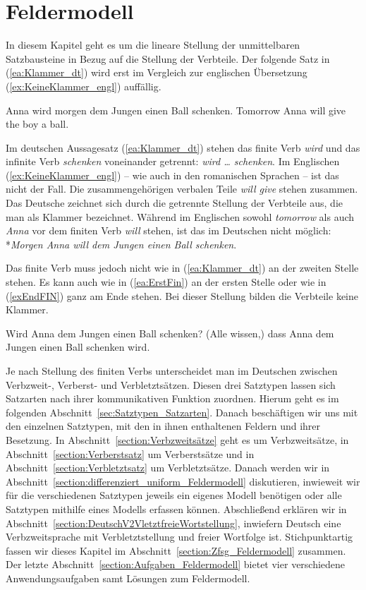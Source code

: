 \chapter{Feldermodell}\label{chapter:Feldermodell}

In diesem Kapitel geht es um die lineare Stellung der unmittelbaren Satzbausteine in Bezug auf die Stellung der Verbteile. Der folgende Satz in (\ref{ea:Klammer_dt}) wird erst im Vergleich zur englischen Übersetzung (\ref{ex:KeineKlammer_engl}) auffällig. 

\ea \label{ea:Satzklammer}
\ea \label{ea:Klammer_dt} Anna wird morgen dem Jungen einen Ball schenken.
\ex \label{ex:KeineKlammer_engl} Tomorrow Anna will give the boy a ball.
\z 
\z

Im deutschen Aussagesatz (\ref{ea:Klammer_dt}) stehen das finite Verb \textit{wird} und das infinite Verb \textit{schenken} voneinander getrennt: \textit{wird \ldots{} schenken}. Im Englischen (\ref{ex:KeineKlammer_engl})  -- wie auch in den romanischen Sprachen -- ist das nicht der Fall. Die zusammengehörigen verbalen Teile \textit{will give} stehen zusammen. Das Deutsche zeichnet sich durch die getrennte Stellung der Verbteile aus, die man als Klammer bezeichnet. Während im Englischen sowohl \textit{tomorrow} als auch \textit{Anna} vor dem finiten Verb \textit{will} stehen, ist das im Deutschen nicht möglich: *\textit{Morgen Anna will dem Jungen einen Ball schenken}.   

Das finite Verb muss jedoch nicht wie in (\ref{ea:Klammer_dt}) an der zweiten Stelle stehen. Es kann auch wie in (\ref{ea:ErstFin}) an der ersten Stelle oder wie in (\ref{exEndFIN}) ganz am Ende stehen. Bei dieser Stellung bilden die Verbteile keine Klammer.

\ea 
\ea \label{ea:ErstFin} Wird Anna dem Jungen einen Ball schenken?
\ex \label{exEndFIN} (Alle wissen,) dass Anna dem Jungen einen Ball schenken wird.
\z 
\z 

Je nach Stellung des finiten Verbs unterscheidet man im Deutschen zwischen Verbzweit-, Verberst- und Verbletztsätzen. Diesen drei Satztypen lassen sich Satzarten nach ihrer kommunikativen Funktion zuordnen. Hierum geht es im folgenden Abschnitt~\ref{sec:Satztypen_Satzarten}. Danach beschäftigen wir uns mit den einzelnen Satztypen, mit den in ihnen enthaltenen Feldern und ihrer Besetzung. In Abschnitt~\ref{section:Verbzweitsätze} geht es um Verbzweitsätze, in Abschnitt~\ref{section:Verberstsatz} um Verberstsätze und in Abschnitt~\ref{section:Verbletztsatz} um Verbletztsätze. Danach werden wir in Abschnitt~\ref{section:differenziert_uniform_Feldermodell} diskutieren, inwieweit wir für die verschiedenen Satztypen jeweils ein eigenes Modell benötigen oder alle Satztypen mithilfe eines Modells erfassen können. Abschließend erklären wir in Abschnitt~\ref{section:DeutschV2VletztfreieWortstellung}, inwiefern Deutsch eine Verbzweitsprache mit Verbletztstellung und freier Wortfolge ist. Stichpunktartig fassen wir dieses Kapitel im Abschnitt~\ref{section:Zfsg_Feldermodell} zusammen. Der letzte Abschnitt~\ref{section:Aufgaben_Feldermodell} bietet vier verschiedene Anwendungsaufgaben samt Lösungen zum Feldermodell. 


